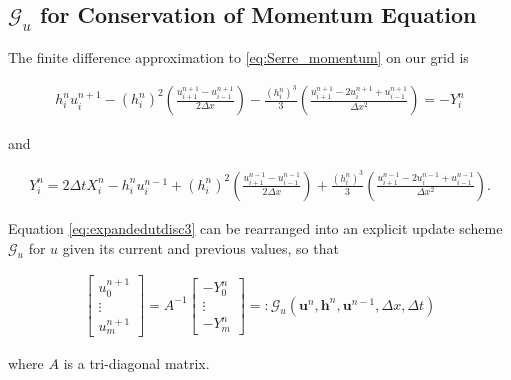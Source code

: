 \documentclass[times]{elsarticle}
\begin{document}
\subsection{$\mathcal{G}_u$ for Conservation of Momentum Equation}
The finite difference approximation to \eqref{eq:Serre_momentum} on our grid is
\begin{linenomath*}
	\begin{gather}
	h^{n}_iu^{n+1}_i - \left(h^{n}_i\right)^2 \left(\frac{u^{n+1}_{i+1} -u^{n+1}_{i-1} }{2 \Delta x}\right) - \frac{\left(h^{n}_i\right)^3}{3}\left(\frac{u^{n+1}_{i+1} - 2u^{n+1}_{i} + u^{n+1}_{i-1} }{\Delta x^2}\right) = - Y^n_i
	\label{eq:expandedutdisc3}
	\end{gather}
\end{linenomath*}
and
\begin{linenomath*}
	\begin{gather*}
	Y_i^n = 2\Delta tX_i^{n} - h_i^{n}u_i^{n-1} + \left(h_i^{n}\right)^2\left(\frac{u^{n-1}_{i+1} -u^{n-1}_{i-1} }{2 \Delta x}\right) + \frac{\left(h_i^{n}\right)^3}{3}\left(\frac{u^{n-1}_{i+1} - 2u^{n-1}_{i} + u^{n-1}_{i-1} }{\Delta x^2}\right).
	\label{eq:expandfactor Xp}
	\end{gather*}
\end{linenomath*}
 Equation \eqref{eq:expandedutdisc3} can be rearranged into an explicit update scheme $\mathcal{G}_u$ for $u$ given its current and previous values, so that
\begin{linenomath*}
	\begin{gather}
	\left[\begin{array}{c}
	u^{n+1}_0 \\
	\vdots \\
	u^{n+1}_m \end{array}\right]
	= A^{-1} \left[\begin{array}{c}
	-Y^n_0 \\
	\vdots \\
	-Y^n_m \end{array}\right] =: \mathcal{G}_u\left(\boldsymbol{u}^n,\boldsymbol{h}^n, \boldsymbol{u}^{n-1}, \Delta x, \Delta t \right)
	\label{eq:FDcentforu}
	\end{gather}
\end{linenomath*}
where $A$ is a tri-diagonal matrix.
\end{document}
